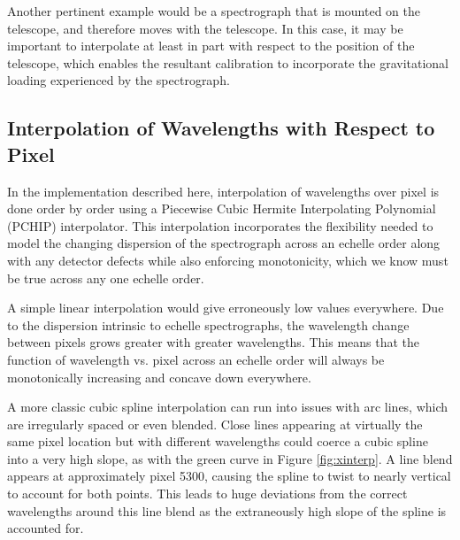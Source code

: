 \documentclass[modern]{aastex63}
\begin{document}
Another pertinent example would be a spectrograph that is mounted on the telescope, and therefore moves with the telescope.  In this case, it may be important to interpolate at least in part with respect to the position of the telescope, which enables the resultant calibration to incorporate the gravitational loading experienced by the spectrograph.


\subsection{Interpolation of Wavelengths with Respect to Pixel}
\label{sec:choice_wvp}
In the implementation described here, interpolation of wavelengths over pixel  is done order by order using a Piecewise Cubic Hermite Interpolating Polynomial (PCHIP) interpolator.  This interpolation incorporates the flexibility needed to model the changing dispersion of the spectrograph across an echelle order along with any detector defects while also enforcing monotonicity, which we know must be true across any one echelle order.

A simple linear interpolation would give erroneously low values everywhere.  Due to the dispersion intrinsic to echelle spectrographs, the wavelength change between pixels grows greater with greater wavelengths.  This means that the function of wavelength vs. pixel across an echelle order will always be monotonically increasing and concave down everywhere.

A more classic cubic spline interpolation can run into issues with arc lines, which are irregularly spaced or even blended.  Close lines appearing at virtually the same pixel location but with different wavelengths could coerce a cubic spline into a very high slope, as with the green curve in Figure \ref{fig:xinterp}.  A line blend appears at approximately pixel 5300, causing the spline to twist to nearly vertical to account for both points.  This leads to huge deviations from the correct wavelengths around this line blend as the extraneously high slope of the spline is accounted for.
\end{document}
